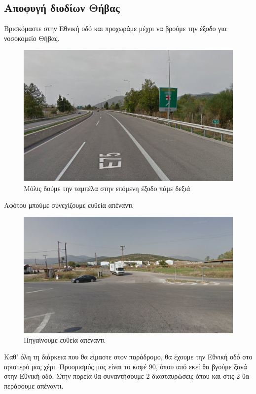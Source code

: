 \begin{center}
\section*{Αποφυγή διοδίων Θήβας}
\end{center}
Βρισκόμαστε στην Εθνική οδό και προχωράμε μέχρι να βρούμε την έξοδο για νοσοκομείο Θήβας.
\begin{figure}[hbp!]
	\centering
		\includegraphics[width=\textwidth]{images/athina-lamia/thiva/thiva1.PNG}
			\caption{Μόλις δούμε την ταμπέλα στην επόμενη έξοδο πάμε δεξιά}
\end{figure}
Αφότου μπούμε συνεχίζουμε ευθεία απέναντι 
\begin{figure}[hbp!]
	\centering
		\includegraphics[width=\textwidth]{images/athina-lamia/thiva/thiva2.PNG}
			\caption{Πηγαίνουμε ευθεία απέναντι}
\end{figure}
\newpage
Καθ' όλη τη διάρκεια που θα είμαστε στον παράδρομο, θα έχουμε την Εθνική οδό στο αριστερό μας χέρι. Προορισμός μας είναι το καφέ 90, όπου από εκεί θα βγούμε ξανά στην Εθνική οδό. Στην πορεία θα συναντήσουμε 2 διασταυρώσεις όπου και στις 2 θα περάσουμε απέναντι. 
